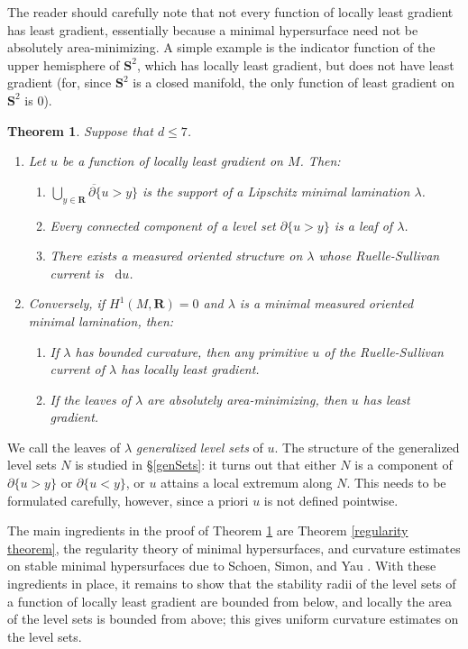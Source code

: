 \documentclass[reqno,11pt]{amsart}
\newcommand{\RR}{\mathbf{R}}
\newcommand{\Sph}{\mathbf S}
\newcommand*\dif{\mathop{}\!\mathrm{d}}
\newcommand{\dfn}[1]{\emph{#1}\index{#1}}
\newtheorem{mainthm}{Theorem}
\theoremstyle{definition}
\numberwithin{equation}{section}
\begin{document}
The reader should carefully note that not every function of locally least gradient has least gradient, essentially because a minimal hypersurface need not be absolutely area-minimizing.
A simple example is the indicator function of the upper hemisphere of $\Sph^2$, which has locally least gradient, but does not have least gradient (for, since $\Sph^2$ is a closed manifold, the only function of least gradient on $\Sph^2$ is $0$).

\begin{mainthm}\label{main thm}
Suppose that $d \leq 7$.
\begin{enumerate}
\item Let $u$ be a function of locally least gradient on $M$.
Then:
\begin{enumerate}
\item $\overline{\bigcup_{y \in \RR} \partial \{u > y\}}$ is the support of a Lipschitz minimal lamination $\lambda$.
\item Every connected component of a level set $\partial \{u > y\}$ is a leaf of $\lambda$.
\item There exists a measured oriented structure on $\lambda$ whose Ruelle-Sullivan current is $\dif u$.
\end{enumerate}
\item Conversely, if $H^1(M, \RR) = 0$ and $\lambda$ is a minimal measured oriented minimal lamination, then:
\begin{enumerate}
\item If $\lambda$ has bounded curvature, then any primitive $u$ of the Ruelle-Sullivan current of $\lambda$ has locally least gradient.
\item If the leaves of $\lambda$ are absolutely area-minimizing, then $u$ has least gradient.
\end{enumerate}
\end{enumerate}
\end{mainthm}

We call the leaves of $\lambda$ \dfn{generalized level sets} of $u$.
The structure of the generalized level sets $N$ is studied in \S\ref{genSets}: it turns out that either $N$ is a component of $\partial \{u > y\}$ or $\partial \{u < y\}$, or $u$ attains a local extremum along $N$.
This needs to be formulated carefully, however, since a priori $u$ is not defined pointwise.

The main ingredients in the proof of Theorem \ref{main thm} are Theorem \ref{regularity theorem}, the regularity theory of minimal hypersurfaces, and curvature estimates on stable minimal hypersurfaces due to Schoen, Simon, and Yau \cite{Schoen75,Schoen81}.
With these ingredients in place, it remains to show that the stability radii of the level sets of a function of locally least gradient are bounded from below, and locally the area of the level sets is bounded from above; this gives uniform curvature estimates on the level sets.
\end{document}
